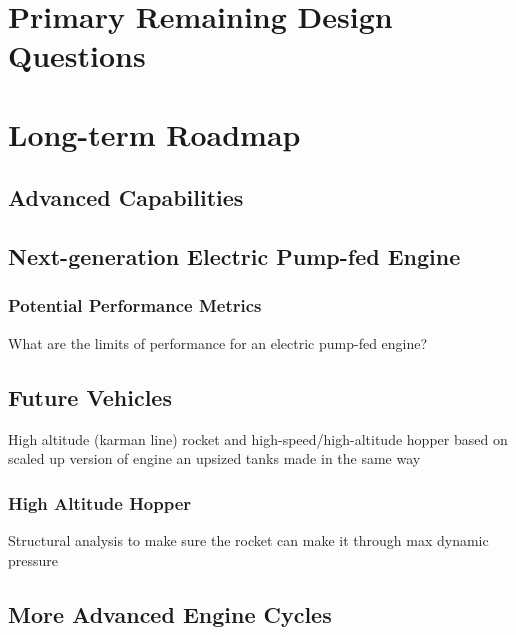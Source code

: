 \documentclass[12pt, letterpaper]{article}
\begin{document}
\section{Primary Remaining Design Questions}

\section{Long-term Roadmap}
\subsection{Advanced Capabilities}
\subsection{Next-generation Electric Pump-fed Engine}
\subsubsection{Potential Performance Metrics}
What are the limits of performance for an electric pump-fed engine?

\subsection{Future Vehicles}
High altitude (karman line) rocket and high-speed/high-altitude hopper based on scaled up version of engine an upsized tanks made in the same way

\subsubsection{High Altitude Hopper}
Structural analysis to make sure the rocket can make it through max dynamic pressure
\subsection{More Advanced Engine Cycles}
\end{document}
